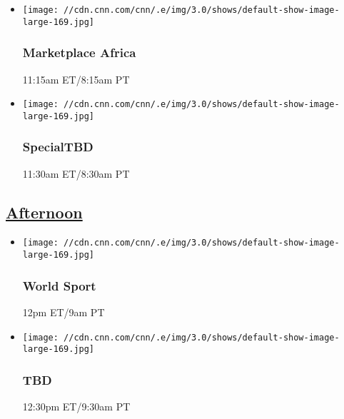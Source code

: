 \begin{itemize}
\item
  \texttt{[image: //cdn.cnn.com/cnn/.e/img/3.0/shows/default-show-image-large-169.jpg]}

  \hypertarget{marketplace-africa}{%
  \subsubsection{Marketplace Africa}\label{marketplace-africa}}

  11:15am ET/8:15am PT
\end{itemize}

\begin{itemize}
\item
  \texttt{[image: //cdn.cnn.com/cnn/.e/img/3.0/shows/default-show-image-large-169.jpg]}

  \hypertarget{specialtbd--1}{%
  \subsubsection{SpecialTBD }\label{specialtbd--1}}

  11:30am ET/8:30am PT
\end{itemize}

\hypertarget{afternoon-}{%
\subsection{\texorpdfstring{\href{/tv/schedule/cnn/index.html}{Afternoon}~}{Afternoon~}}\label{afternoon-}}

\begin{itemize}
\item
  \texttt{[image: //cdn.cnn.com/cnn/.e/img/3.0/shows/default-show-image-large-169.jpg]}

  \hypertarget{world-sport}{%
  \subsubsection{World Sport}\label{world-sport}}

  12pm ET/9am PT
\end{itemize}

\begin{itemize}
\item
  \texttt{[image: //cdn.cnn.com/cnn/.e/img/3.0/shows/default-show-image-large-169.jpg]}

  \hypertarget{tbd}{%
  \subsubsection{TBD}\label{tbd}}

  12:30pm ET/9:30am PT
\end{itemize}

